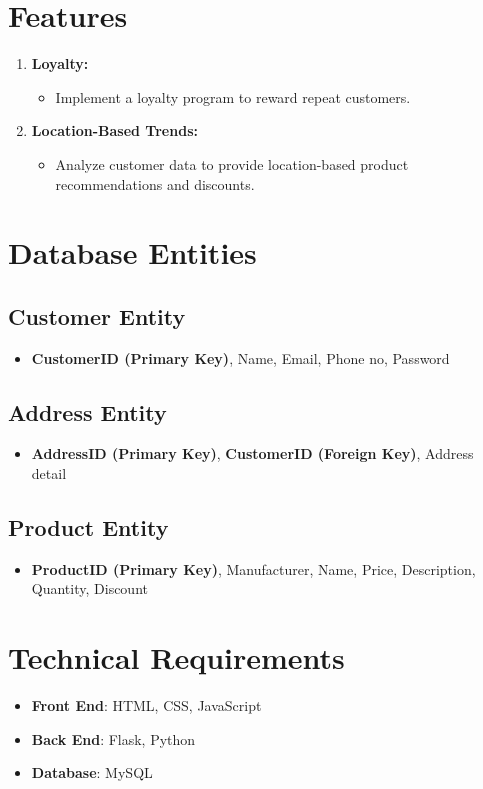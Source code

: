 \documentclass[12pt]{article}
\begin{document}
\section*{Features}
\begin{enumerate}[label=\arabic*.]
    \item \textbf{Loyalty:}
          \begin{itemize}
              \item Implement a loyalty program to reward repeat customers.
          \end{itemize}
    \item \textbf{Location-Based Trends:}
          \begin{itemize}
              \item Analyze customer data to provide location-based product recommendations and discounts.
          \end{itemize}
\end{enumerate}

\section*{Database Entities}

\subsection*{Customer Entity}
\begin{itemize}
    \item \textbf{CustomerID (Primary Key)}, Name, Email, Phone no, Password

\end{itemize}

\subsection*{Address Entity}
\begin{itemize}
    \item \textbf{AddressID (Primary Key)}, \textbf{CustomerID (Foreign Key)}, Address detail

\end{itemize}

\subsection*{Product Entity}
\begin{itemize}
    \item \textbf{ProductID (Primary Key)}, Manufacturer, Name, Price, Description, Quantity, Discount

\end{itemize}

\section*{Technical Requirements}
\begin{itemize}
    \item \textbf{Front End}: HTML, CSS, JavaScript
    \item \textbf{Back End}: Flask, Python
    \item \textbf{Database}: MySQL

\end{itemize}
\end{document}
